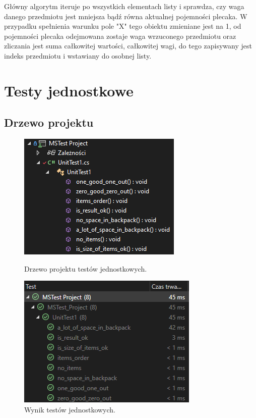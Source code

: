 \documentclass{report}
\begin{document}
Główny algorytm iteruje po wszystkich elementach listy i sprawdza, czy waga danego przedmiotu jest mniejsza bądź równa aktualnej pojemności plecaka. W przypadku spełnienia warunku pole "X" tego obiektu zmieniane jest na 1, od pojemności plecaka odejmowana zostaje waga wrzuconego przedmiotu oraz zliczania jest suma całkowitej wartości, całkowitej wagi, do tego zapisywany jest indeks przedmiotu i wstawiany do osobnej listy.


\chapter{Testy jednostkowe}

\section{Drzewo projektu}

\begin{figure}[H]%
	\begin{minipage}{0.5\linewidth}
		\centering
		\includegraphics[scale=0.7]{zdj/testy_drzewo}
		\caption{Drzewo projektu testów jednostkowych.}
	\end{minipage}
	\begin{minipage}{0.5\linewidth}
		\centering
		\includegraphics[scale=0.7]{zdj/test_result}
		\caption{Wynik testów jednostkowych.}
	\end{minipage}
\end{figure}
\end{document}
